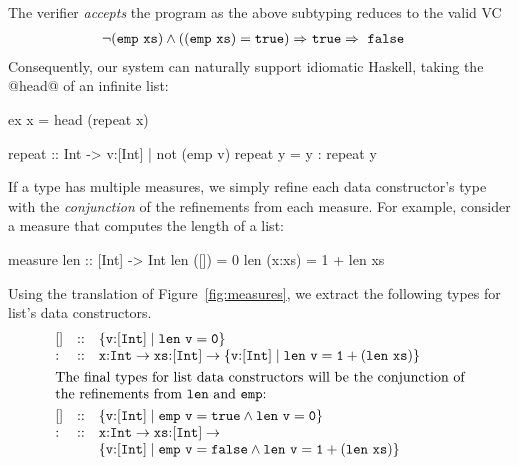 The verifier \emph{accepts} the program as the above subtyping reduces to the valid VC
\begin{align*}
\lnot (\ttemp\ \ttxs) \wedge ((\ttemp\ \ttxs)= \tttrue) \Rightarrow\ & \tttrue \Rightarrow\ \ttfalse
\end{align*}
%
%
Consequently, our system can naturally support idiomatic 
Haskell, \eg taking the @head@ of an infinite list:
%
\begin{code}
  ex x     = head (repeat x)
  
  repeat   :: Int -> {v:[Int] | not (emp v)}
  repeat y = y : repeat y
\end{code}
%


If a type has multiple measures, we simply refine each data constructor's type
with the \emph{conjunction} of the refinements from each measure.
%
For example, consider a measure that computes the length of a list:
\begin{code}
  measure len  :: [Int] -> Int
    len ([])   = 0
    len (x:xs) = 1 + len xs
\end{code}
%
Using the translation of Figure~\ref{fig:measures},
we extract the following types for list's data constructors.
$$
\begin{array}{lcl}
\text{[]}  & :: & \ttreft{v}{[\tint]}{len\ v = 0}\\
{:}  & :: & \tfun{\ttx}{\tint}{\tfun{\ttxs}{[\tint]}{\ttreft{v}{[\tint]}{len\ v = 1 + (len\ xs)}}}\\[0.05in]
\multicolumn{3}{l}{
\text{The final types for list data constructors will be the 
conjunction of}}\\
\multicolumn{3}{l}{
\text{the refinements from $\mathtt{len}$ and $\mathtt{emp}$:}
}\\[0.05in]
\text{[]}  & :: & \ttreft{v}{[\tint]}{emp\ v = true \land len\ v = 0}\\
{:}  & :: & \tfun{\ttx}{\tint}{\tfun{\ttxs}{[\tint]}\\ &&
{\ttreft{v}{[\tint]}{emp\ v = false \land len\ v = 1 + (len\ xs)}}}
\end{array}
$$




